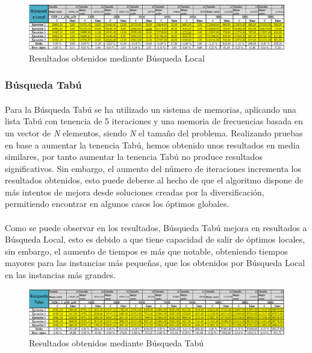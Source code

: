 \documentclass{article}
\begin{document}
			\begin{figure}[H]
				
				\centering
				\includegraphics[scale=0.4]{img/blocalResult}
				\caption{Resultados obtenidos mediante Búsqueda Local}
				
			\end{figure}
			
		\subsubsection{Búsqueda Tabú}
	
			\paragraph{}Para la Búsqueda Tabú se ha utilizado un sistema de memorias, aplicando una lista Tabú con tenencia de 5 iteraciones y una memoria de frecuencias basada en un vector de \emph{N} elementos, siendo \emph{N} el tamaño del problema. Realizando pruebas en base a aumentar la tenencia Tabú, hemos obtenido unos resultados en media similares, por tanto aumentar la tenencia Tabú no produce resultados significativos. Sin embargo, el aumento del número de iteraciones incrementa los resultados obtenidos, esto puede deberse al hecho de que el algoritmo dispone de más intentos de mejora desde soluciones creadas por la diversificación, permitiendo encontrar en algunos casos los óptimos globales.
			
			\paragraph{}Como se puede observar en los resultados, Búsqueda Tabú mejora en resultados a Búsqueda Local, esto es debido a que tiene capacidad de salir de óptimos locales, sin embargo, el aumento de tiempos es más que notable, obteniendo tiempos mayores para las instancias más pequeñas, que los obtenidos por Búsqueda Local en las instancias más grandes.
			
			\begin{figure}[H]
				
				\centering
				\includegraphics[scale=0.4]{img/btabuResult}
				\caption{Resultados obtenidos mediante Búsqueda Tabú}
				
			\end{figure}
	
\end{document}

